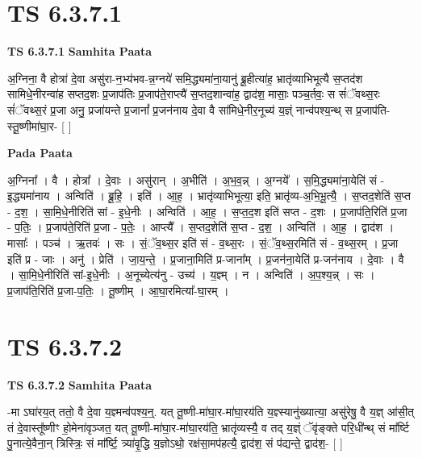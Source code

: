 \documentclass[17pt]{extarticle}
\begin{document}

\section{ TS 6.3.7.1 }

\textbf{TS 6.3.7.1 } \newline
\textbf{Samhita Paata} \newline

अ॒ग्निना॒ वै होत्रा॑ दे॒वा असु॑रा-न॒भ्य॑भव-न्न॒ग्नये॑ समि॒द्ध्यमा॑ना॒यानु॑ ब्रू॒हीत्या॑ह॒ भ्रातृ॑व्याभिभूत्यै स॒प्तद॑श सामिधे॒नीरन्वा॑ह सप्तद॒शः प्र॒जाप॑तिः प्र॒जाप॑ते॒राप्त्यै॑ स॒प्तद॒शान्वा॑ह॒ द्वाद॑श॒ मासाः॒ पञ्च॒र्तवः॒ स सं॑ॅवथ्स॒रः सं॑ॅवथ्स॒रं प्र॒जा अनु॒ प्रजा॑यन्ते प्र॒जानां᳚ प्र॒जन॑नाय दे॒वा वै सा॑मिधे॒नीर॒नूच्य॑ य॒ज्ञ्ं नान्व॑पश्य॒न्थ् स प्र॒जाप॑ति-स्तू॒ष्णीमा॑घा॒र- [  ] \newline

\textbf{Pada Paata} \newline

अ॒ग्निना᳚ । वै । होत्रा᳚ । दे॒वाः । असु॑रान् । अ॒भीति॑ । अ॒भ॒व॒न्न् । अ॒ग्नये᳚ । स॒मि॒द्ध्यमा॑ना॒येति॑ सं - इ॒द्ध्यमा॑नाय । अन्विति॑ । ब्रू॒हि॒ । इति॑ । आ॒ह॒ । भ्रातृ॑व्याभिभूत्या॒ इति॒ भ्रातृ॑व्य-अ॒भि॒भू॒त्यै॒ । स॒प्तद॒शेति॑ स॒प्त - द॒श॒ । सा॒मि॒धे॒नीरिति॑ सां - इ॒धे॒नीः । अन्विति॑ । आ॒ह॒ । स॒प्त॒द॒श इति॑ सप्त - द॒शः । प्र॒जाप॑ति॒रिति॑ प्र॒जा - प॒तिः॒ । प्र॒जाप॑ते॒रिति॑ प्र॒जा - प॒तेः॒ । आप्त्यै᳚ । स॒प्तद॒शेति॑ स॒प्त - द॒श॒ । अन्विति॑ । आ॒ह॒ । द्वाद॑श । मासाः᳚ । पञ्च॑ । ऋ॒तवः॑ । सः । सं॒ॅव॒थ्स॒र इति॑ सं - व॒थ्स॒रः । सं॒ॅव॒थ्स॒रमिति॑ सं - व॒थ्स॒रम् । प्र॒जा इति॑ प्र - जाः । अनु॑ । प्रेति॑ । जा॒य॒न्ते॒ । प्र॒जाना॒मिति॑ प्र-जाना᳚म् । प्र॒जन॑ना॒येति॑ प्र-जन॑नाय । दे॒वाः । वै । सा॒मि॒धे॒नीरिति॑ सां-इ॒धे॒नीः । अ॒नूच्येत्य॑नु - उच्य॑ । य॒ज्ञ्म् । न । अन्विति॑ । अ॒प॒श्य॒न्न् । सः । प्र॒जाप॑ति॒रिति॑ प्र॒जा-प॒तिः॒ । तू॒ष्णीम् । आ॒घा॒रमित्या᳚-घा॒रम् ।  \newline





\section{ TS 6.3.7.2 }

\textbf{TS 6.3.7.2 } \newline
\textbf{Samhita Paata} \newline

-मा ऽघा॑रय॒त् ततो॒ वै दे॒वा य॒ज्ञ्मन्व॑पश्य॒न्॒. यत् तू॒ष्णी-मा॑घा॒र-मा॑घा॒रय॑ति य॒ज्ञ्स्यानु॑ख्यात्या॒ असु॑रेषु॒ वै य॒ज्ञ् आ॑सी॒त् तं दे॒वास्तू᳚ष्णीꣳ हो॒मेना॑वृञ्जत॒ यत् तू॒ष्णी-मा॑घा॒र-मा॑घा॒रय॑ति॒ भ्रातृ॑व्यस्यै॒ व तद् य॒ज्ञ्ं ॅवृ॑ङ्क्ते परि॒धी॑न्थ् सं मा᳚र्ष्टि पु॒नात्ये॒वैना॒न् त्रिस्त्रिः॒ सं मा᳚र्ष्टि॒ त्र्या॑वृ॒द्धि य॒ज्ञोऽथो॒ रक्ष॑सा॒मप॑हत्यै॒ द्वाद॑श॒ सं प॑द्यन्ते॒ द्वाद॑श॒- [  ] \newline
\end{document}
